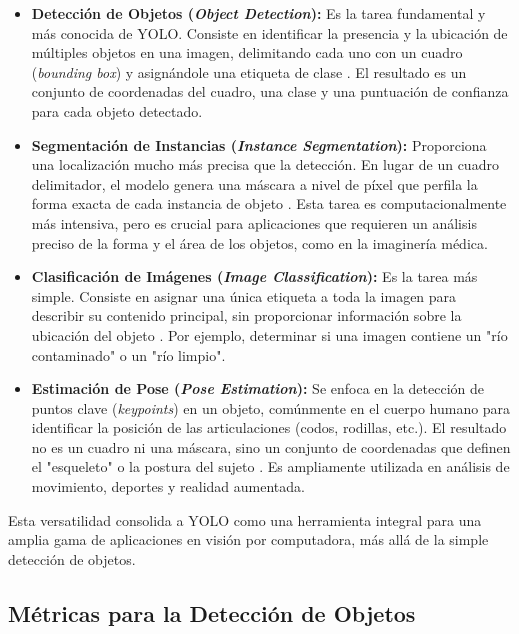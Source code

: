 \begin{itemize}
    \item \textbf{Detección de Objetos (\textit{Object Detection}):} Es la tarea fundamental y más conocida de YOLO. Consiste en identificar la presencia y la ubicación de múltiples objetos en una imagen, delimitando cada uno con un cuadro (\textit{bounding box}) y asignándole una etiqueta de clase \cite{terven2023yolo}. El resultado es un conjunto de coordenadas del cuadro, una clase y una puntuación de confianza para cada objeto detectado.

    \item \textbf{Segmentación de Instancias (\textit{Instance Segmentation}):} Proporciona una localización mucho más precisa que la detección. En lugar de un cuadro delimitador, el modelo genera una máscara a nivel de píxel que perfila la forma exacta de cada instancia de objeto \cite{ultralyticsYOLOv8}. Esta tarea es computacionalmente más intensiva, pero es crucial para aplicaciones que requieren un análisis preciso de la forma y el área de los objetos, como en la imaginería médica.

    \item \textbf{Clasificación de Imágenes (\textit{Image Classification}):} Es la tarea más simple. Consiste en asignar una única etiqueta a toda la imagen para describir su contenido principal, sin proporcionar información sobre la ubicación del objeto \cite{sapkota2025yolo}. Por ejemplo, determinar si una imagen contiene un "río contaminado" o un "río limpio".

    \item \textbf{Estimación de Pose (\textit{Pose Estimation}):} Se enfoca en la detección de puntos clave (\textit{keypoints}) en un objeto, comúnmente en el cuerpo humano para identificar la posición de las articulaciones (codos, rodillas, etc.). El resultado no es un cuadro ni una máscara, sino un conjunto de coordenadas que definen el "esqueleto" o la postura del sujeto \cite{ultralyticsYOLOv8}. Es ampliamente utilizada en análisis de movimiento, deportes y realidad aumentada.
\end{itemize}

Esta versatilidad consolida a YOLO como una herramienta integral para una amplia gama de aplicaciones en visión por computadora, más allá de la simple detección de objetos.

\subsection{Métricas para la Detección de Objetos}
\label{subsec:metrics}

